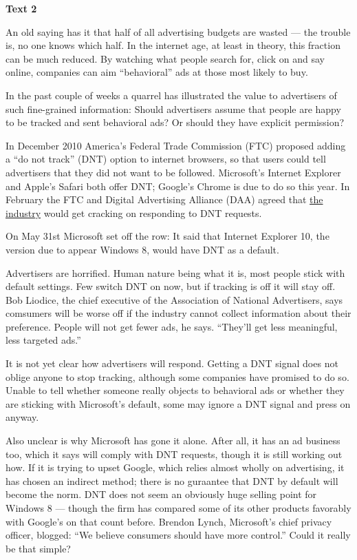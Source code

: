 
\begin{center}\textbf{Text 2}\end{center}

\qquad An old saying has it that half of all advertising budgets are wasted --- the trouble is, no one knows which half. In the internet age, at least in theory, this fraction can be much reduced. By watching what people search for, click on and say online, companies can aim ``behavioral'' ads at those most likely to buy.

\qquad In the past couple of weeks a quarrel has illustrated the value to advertisers of such fine-grained information: Should advertisers assume that people are happy to be tracked and sent behavioral ads? Or should they have explicit permission?

\qquad In December 2010 America's Federal Trade Commission (FTC) proposed adding a ``do not track'' (DNT) option to internet browsers, so that users could tell advertisers that they did not want to be followed. Microsoft's Internet Explorer and Apple's Safari both offer DNT; Google's Chrome is due to do so this year. In February the FTC and Digital Advertising Alliance (DAA) agreed that \ul{the industry} would get cracking on responding to DNT requests.

\qquad On May 31st Microsoft set off the row: It said that Internet Explorer 10, the version due to appear Windows 8, would have DNT as a default.

\qquad Advertisers are horrified. Human nature being what it is, most people stick with default settings. Few switch DNT on now, but if tracking is off it will stay off. Bob Liodice, the chief executive of the Association of National Advertisers, says comsumers will be worse off if the industry cannot collect information about their preference. People will not get fewer ads, he says. ``They'll get less meaningful, less targeted ads.''

\qquad It is not yet clear how advertisers will respond. Getting a DNT signal does not oblige anyone to stop tracking, although some companies have promised to do so. Unable to tell whether someone really objects to behavioral ads or whether they are sticking with Microsoft's default, some may ignore a DNT signal and press on anyway.

\qquad Also unclear is why Microsoft has gone it alone. After all, it has an ad business too, which it says will comply with DNT requests, though it is still working out how. If it is trying to upset Google, which relies almost wholly on advertising, it has chosen an indirect method; there is no guraantee that DNT by default will become the norm. DNT does not seem an obviously huge selling point for Windows 8 --- though the firm has compared some of its other products favorably with Google's on that count before. Brendon Lynch, Microsoft's chief privacy officer, blogged: ``We believe consumers should have more control.'' Could it really be that simple?

